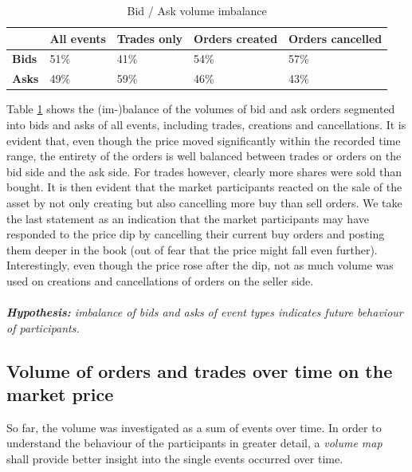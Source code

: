 \begin{table}[H]
\centering
\begin{tabular}{l|l|l|l|l|}
\cline{2-5}
& \textbf{All events} & \textbf{Trades only} & \textbf{Orders created} & \textbf{Orders cancelled} \\ \hline
\multicolumn{1}{|l|}{\textbf{Bids}} & 51\%                & 41\%                 & 54\%                    & 57\%                      \\ \hline
\multicolumn{1}{|l|}{\textbf{Asks}} & 49\%                & 59\%                 & 46\%                    & 43\%                      \\ \hline
\end{tabular}
\caption{Bid / Ask volume imbalance}
\label{tbl:data-imbalance}
\end{table}

Table \ref{tbl:data-imbalance} shows the (im-)balance of the volumes of bid and ask orders segmented into bids and asks of all events, including trades, creations and cancellations. 
It is evident that, even though the price moved significantly within the recorded time range, the entirety of the orders is well balanced between trades or orders on the bid side and the ask side.
For trades however, clearly more shares were sold than bought.
It is then evident that the market participants reacted on the sale of the asset by not only creating but also cancelling more buy than sell orders.
We take the last statement as an indication that the market participants may have responded to the price dip by cancelling their current buy orders and posting them deeper in the book (out of fear that the price might fall even further).
Interestingly, even though the price rose after the dip, not as much volume was used on creations and cancellations of orders on the seller side.
\\
\\
\textit{\textbf{Hypothesis:} imbalance of bids and asks of event types indicates future behaviour of participants.}

\subsection{Volume of orders and trades over time on the market price}
\label{sec:data-hypthesis-order-trade-volume-time}

So far, the volume was investigated as a sum of events over time.
In order to understand the behaviour of the participants in greater detail, a \textit{volume map} shall provide better insight into the single events occurred over time.

